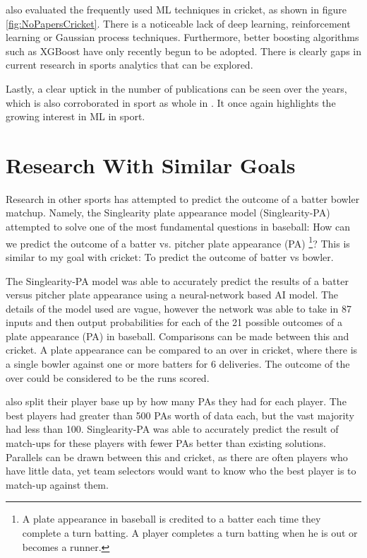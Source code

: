 \documentclass[12pt,a4paper]{report}
\theoremstyle{definition}
\begin{document}
\citet{Wickramasinghe2022} also evaluated the frequently used ML techniques in cricket, as shown in figure \ref{fig:NoPapersCricket}. 
There is a noticeable lack of deep learning, reinforcement learning or Gaussian process techniques.
Furthermore, better boosting algorithms such as XGBoost have only recently begun to be adopted.
There is clearly gaps in current research in sports analytics that can be explored.

Lastly, a clear uptick in the number of publications can be seen over the years, which is also corroborated in sport as whole in \citet{horvat2020}.
It once again highlights the growing interest in ML in sport.

\section{Research With Similar Goals} \label{sec:ResearchWithSimilarGoals}

Research in other sports has attempted to predict the outcome of a batter bowler matchup.
Namely, the Singlearity plate appearance model (Singlearity-PA) \citep{silver2021baseball} attempted to solve one of the most fundamental questions in baseball:	 How can we	predict the outcome of a batter	vs. pitcher plate appearance (PA) \footnote{A plate appearance in baseball is credited to a batter each time they complete a turn batting. A player completes a turn batting when he is out or becomes a runner.}? 
This is similar to my goal with cricket: To predict the outcome of batter vs bowler.

The Singlearity-PA model \citep{silver2021baseball} was able to accurately predict the results of a batter versus pitcher plate appearance using a neural-network based AI model. 
The details of the model used are vague, however the network was able to take in 87 inputs and then output probabilities for each of the 21 possible outcomes of a plate appearance (PA) in baseball. 
Comparisons can be made between this and cricket. 
A plate appearance can be compared to an over in cricket, where there is a single bowler against one or more batters for 6 deliveries. 
The outcome of the over could be considered to be the runs scored. 

\citet{silver2021baseball} also split their player base up by how many PAs they had for each player. 
The best players had greater than 500 PAs worth of data each, but the vast majority had less than 100. 
Singlearity-PA was able to accurately predict the result of match-ups for these players with fewer PAs better than existing solutions. 
Parallels can be drawn between this and cricket, as there are often players who have little data, yet team selectors would want to know who the best player is to match-up against them.
\end{document}
